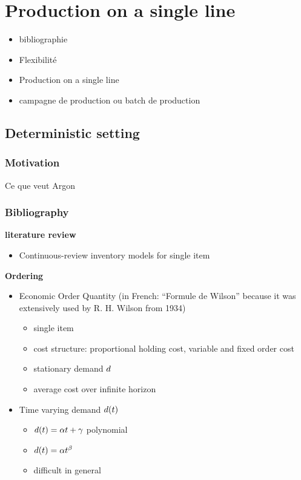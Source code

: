 \chapter{Production on a single line}
\label{chap:lot-size on single line}


\begin{itemize}
  \item bibliographie
  \item Flexibilité
  \item Production on a single line
  \item campagne de production ou batch de production
\end{itemize}



\section{Deterministic setting}

\subsection{Motivation}

Ce que veut Argon

\subsection{Bibliography}

\textbf{literature review}

\begin{itemize}
   \item \cite{Gayon2016} Continuous-review inventory models for single item
\end{itemize} 

\medskip

\textbf{Ordering}

\begin{itemize}
  \item \cite{Harris1913} Economic Order Quantity (in French: ``Formule de Wilson'' because it was extensively used by R. H. Wilson from 1934)
  \begin{itemize}
    \item single item
    \item cost structure: proportional holding cost, variable and fixed order cost
    \item stationary demand $d$
    \item average cost over infinite horizon
  \end{itemize}
  \item Time varying demand $d(t)$
  \begin{itemize}
    \item \cite{Resh1976,Donaldson1977} $d(t)=\alpha t+\gamma$ polynomial
    \item \cite{Barbosa1978} $d(t)=\alpha t^{\beta}$
    \item difficult in general
  \end{itemize}
\end{itemize}

